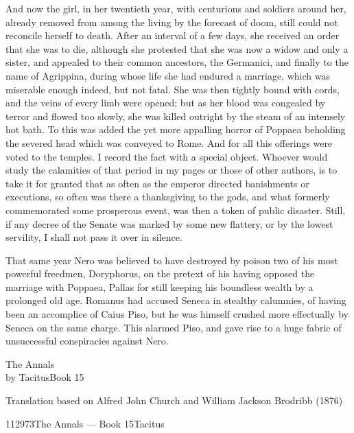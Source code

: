 
And now the girl, in her twentieth year, with centurions and soldiers around her, already removed from among the living by the forecast of doom, still could not reconcile herself to death. After an interval of a few days, she received an order that she was to die, although she protested that she was now a widow and only a sister, and appealed to their common ancestors, the Germanici, and finally to the name of Agrippina, during whose life she had endured a marriage, which was miserable enough indeed, but not fatal. She was then tightly bound with cords, and the veins of every limb were opened; but as her blood was congealed by terror and flowed too slowly, she was killed outright by the steam of an intensely hot bath. To this was added the yet more appalling horror of Poppaea beholding the severed head which was conveyed to Rome. And for all this offerings were voted to the temples. I record the fact with a special object. Whoever would study the calamities of that period in my pages or those of other authors, is to take it for granted that as often as the emperor directed banishments or executions, so often was there a thanksgiving to the gods, and what formerly commemorated some prosperous event, was then a token of public disaster. Still, if any decree of the Senate was marked by some new flattery, or by the lowest servility, I shall not pass it over in silence.


That same year Nero was believed to have destroyed by poison two of his most powerful freedmen, Doryphorus, on the pretext of his having opposed the marriage with Poppaea, Pallas for still keeping his boundless wealth by a prolonged old age. Romanus had accused Seneca in stealthy calumnies, of having been an accomplice of Caius Piso, but he was himself crushed more effectually by Seneca on the same charge. This alarmed Piso, and gave rise to a huge fabric of unsuccessful conspiracies against Nero.


The Annals\\
by TacitusBook 15

Translation based on Alfred John Church and William Jackson Brodribb (1876)

112973The Annals — Book 15Tacitus


